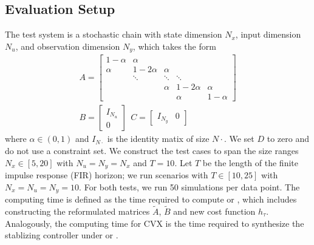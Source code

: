 \subsection{Evaluation Setup}
The test system is a stochastic chain with state dimension $N_x$, input dimension $N_u$, and observation dimension $N_y$, which takes the form
\begin{align*}
    A = \begin{bmatrix}
        1-\alpha & \alpha & & & \\
        \alpha & 1-2\alpha & \alpha & & \\
        & \ddots & \ddots & \ddots & \\
        & & \alpha & 1-2\alpha & \alpha \\
        & & & \alpha & 1-\alpha
    \end{bmatrix}\\
    B = \begin{bmatrix}
        I_{N_u} \\
        0
    \end{bmatrix}\ \ 
    C = \begin{bmatrix}
        I_{N_y} & 0
    \end{bmatrix}
\end{align*}
where $\alpha \in (0,1)$ and $I_{N\cdot}$ is the identity matix of size $N\cdot$. We set $D$ to zero and do not use a constraint set. 
We construct the test cases to span the size ranges $N_x \in [5,20]$ with $N_u = N_y = N_x$ and $T=10$. 
Let $T$ be the length of the finite impulse response (FIR) horizon; we run scenarios with $T \in [10,25]$ with $N_x=N_u=N_y=10$. For both tests, we run 50 simulations per data point.
The computing time is defined as the time required to 
compute  or , which includes constructing the reformulated matrices $\tilde{A}$, $\tilde{B}$ and new cost function $h_{\tau}$. Analogously, the
computing time for CVX is the time required to synthesize the stablizing controller under \alg{H2} or \alg{LQ}.
